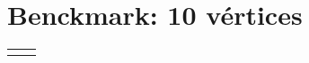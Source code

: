 \documentclass[10pt]{article}
\begin{document}
\centering

\section*{Benckmark: 10 v\'ertices}

\begin{tabular}{|c|c|}
\hline
\begin{minipage}{0.5\linewidth}
\scriptsize 
 
\end{minipage} 
& 
\begin{minipage}{0.5\linewidth}
\scriptsize
 
\end{minipage} 
\\
\hline
\begin{minipage}{0.5\linewidth}
\scriptsize

\end{minipage}
&
\begin{minipage}{0.5\linewidth}
\scriptsize

\end{minipage}
\\
\hline
\end{tabular}
\end{document}
